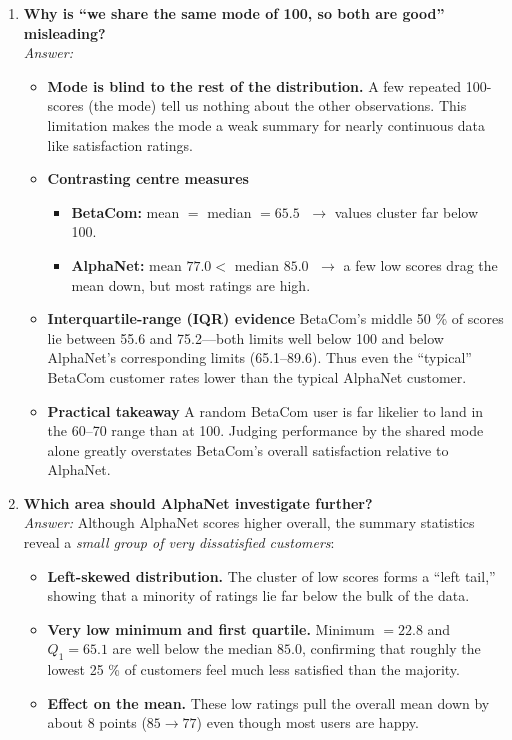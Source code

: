 \documentclass[12pt]{article}
\begin{document}
\begin{enumerate}[label=2.\arabic*]
\item \textbf{Why is “we share the same mode of 100, so both are good” misleading?}\\[2pt]
\textit{Answer:}
\begin{itemize}
    \item \textbf{Mode is blind to the rest of the distribution.}
          A few repeated 100-scores (the mode) tell us nothing about the other observations.  This limitation makes the mode a weak summary for nearly continuous data like satisfaction ratings.
    \item \textbf{Contrasting centre measures}
          \begin{itemize}
              \item \textbf{BetaCom:} mean \(=\) median \(=65.5\) \(\;\to\) values cluster far below 100.
              \item \textbf{AlphaNet:} mean \(77.0<\) median \(85.0\) \(\;\to\) a few low scores drag the mean down, but most ratings are high.
          \end{itemize}
    \item \textbf{Interquartile-range (IQR) evidence}
          BetaCom’s middle 50 \% of scores lie between 55.6 and 75.2—both limits well below 100 and below AlphaNet’s corresponding limits (65.1–89.6).  Thus even the “typical” BetaCom customer rates lower than the typical AlphaNet customer.
    \item \textbf{Practical takeaway}
          A random BetaCom user is far likelier to land in the 60–70 range than at 100.  Judging performance by the shared mode alone greatly overstates BetaCom’s overall satisfaction relative to AlphaNet.
\end{itemize}

\item \textbf{Which area should AlphaNet investigate further?}\\[2pt]
    \textit{Answer:}
Although AlphaNet scores higher overall, the summary statistics reveal a \emph{small group of very dissatisfied customers}:
\begin{itemize}
    \item \textbf{Left-skewed distribution.}
          The cluster of low scores forms a ``left tail,” showing that a minority of ratings lie far below the bulk of the data.
    \item \textbf{Very low minimum and first quartile.}
          Minimum \(=22.8\) and \(Q_1=65.1\) are well below the median \(85.0\), confirming that roughly the lowest 25 \% of customers feel much less satisfied than the majority.
    \item \textbf{Effect on the mean.}
          These low ratings pull the overall mean down by about 8 points (\(85\to77\)) even though most users are happy.


\end{itemize}
\end{enumerate}
\end{document}
